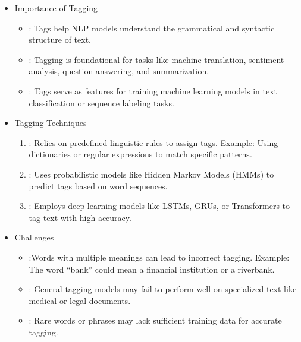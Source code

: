\documentclass[letterpaper,11pt,english]{sphinxmanual}
\begin{document}
\begin{itemize}
\item {} 
\sphinxAtStartPar
Importance of Tagging
\begin{itemize}
\item {} 
\sphinxAtStartPar
{}: Tags help NLP models understand the grammatical and syntactic structure of text.

\item {} 
\sphinxAtStartPar
{}: Tagging is foundational for tasks like machine
translation, sentiment analysis, question answering, and summarization.

\item {} 
\sphinxAtStartPar
{}: Tags serve as features for training machine learning models in
text classification or sequence labeling tasks.

\end{itemize}

\item {} 
\sphinxAtStartPar
Tagging Techniques
\begin{enumerate}
%
\item {} 
\sphinxAtStartPar
{}: Relies on predefined linguistic rules to assign tags.
Example: Using dictionaries or regular expressions to match specific patterns.

\item {} 
\sphinxAtStartPar
{}: Uses probabilistic models like Hidden Markov Models (HMMs)
to predict tags based on word sequences.

\item {} 
\sphinxAtStartPar
{}: Employs deep learning models like LSTMs, GRUs, or Transformers
to tag text with high accuracy.

\end{enumerate}

\item {} 
\sphinxAtStartPar
Challenges
\begin{itemize}
\item {} 
\sphinxAtStartPar
{}:Words with multiple meanings can lead to incorrect tagging.
Example: The word “bank” could mean a financial institution or a riverbank.

\item {} 
\sphinxAtStartPar
{}: General tagging models may fail to perform well on specialized text
like medical or legal documents.

\item {} 
\sphinxAtStartPar
{}: Rare words or phrases may lack sufficient training data for accurate tagging.

\end{itemize}

\end{itemize}
\end{document}
